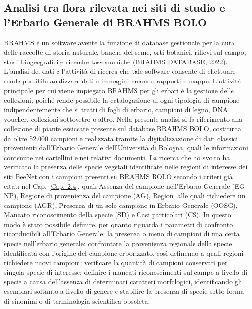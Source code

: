 \documentclass[main.tex]{subfiles}
\begin{document}
\subsection{Analisi tra flora rilevata nei siti di studio e l’Erbario Generale di BRAHMS BOLO}

BRAHMS è un software avente la funzione di database gestionale per la cura delle raccolte di storia naturale, banche del seme, orti botanici, rilievi sul campo, studi biogeografici e ricerche tassonomiche \href{https://herbaria.plants.ox.ac.uk/bol/}{(BRAHMS DATABASE, 2022)}. L’analisi dei dati e l’attività di ricerca che tale software consente di effettuare rende possibile analizzare dati e immagini creando rapporti e mappe.
L’attività principale per cui viene impiegato BRAHMS per gli erbari è la gestione delle collezioni, poiché rende possibile la catalogazione di ogni tipologia di campione indipendentemente che si tratti di fogli di erbario, campioni di legno, DNA voucher, collezioni sottovetro o altro.
Nella presente analisi si fa riferimento alla collezione di piante essiccate presente sul database BRAHMS BOLO, costituita da oltre 52.000 campioni e realizzata tramite la digitalizzazione di dati classici provenienti dall’Erbario Generale dell’Università di Bologna, quali le informazioni contenute nei cartellini e nei relativi documenti.
La ricerca che ho svolto ha verificato la presenza delle specie vegetali identificate nelle regioni di interesse dei siti BeeNet con i campioni presenti su BRAHMS BOLO secondo i criteri già citati nel Cap. \ref{Cap. 2.4}, quali Assenza del campione nell’Erbario Generale (EG-NP), Regione di provenienza del campione (AG), Regioni alle quali richiedere un campione (AGR), Presenza di un solo campione in Erbario Generale (OOSG), Mancato riconoscimento della specie (SD) e Casi particolari (CS). In questo modo è stato possibile definire, per quanto riguarda i parametri di confronto riconducibili all’Erbario Generale: la presenza o meno di campioni di una certa specie nell’erbario generale; confrontare la provenienza regionale della specie identificata con l’origine del campione erborizzato, così definendo a quali regioni richiedere nuovi campioni; verificare la quantità di campioni conservati per singola specie di interesse; definire i mancati riconoscimenti sul campo a livello di specie a causa dell’assenza di determinati caratteri morfologici, identificando gli esemplari soltanto a livello di genere e stabilire la presenza di specie sotto forma di sinonimi o di terminologia scientifica obsoleta.
\end{document}
